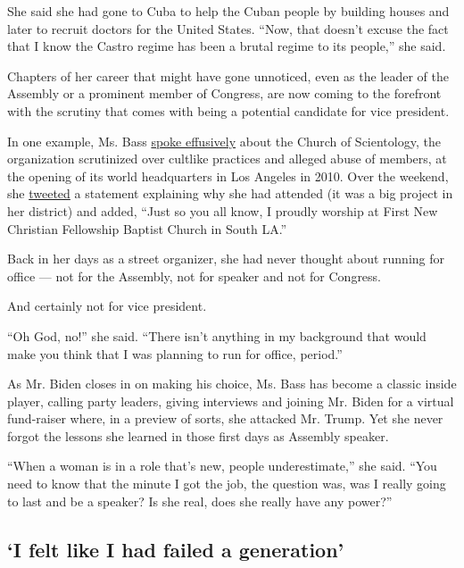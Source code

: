 She said she had gone to Cuba to help the Cuban people by building
houses and later to recruit doctors for the United States. ``Now, that
doesn't excuse the fact that I know the Castro regime has been a brutal
regime to its people,'' she said.

Chapters of her career that might have gone unnoticed, even as the
leader of the Assembly or a prominent member of Congress, are now coming
to the forefront with the scrutiny that comes with being a potential
candidate for vice president.

In one example, Ms. Bass
\href{https://www.scientology.org/scientology-today/church-openings/church-of-scientology-los-angeles.html}{spoke
effusively} about the Church of Scientology, the organization
scrutinized over cultlike practices and alleged abuse of members, at the
opening of its world headquarters in Los Angeles in 2010. Over the
weekend, she
\href{https://twitter.com/KarenBassTweets/status/1289574623424573442?s=20}{tweeted}
a statement explaining why she had attended (it was a big project in her
district) and added, ``Just so you all know, I proudly worship at First
New Christian Fellowship Baptist Church in South LA.''

Back in her days as a street organizer, she had never thought about
running for office --- not for the Assembly, not for speaker and not for
Congress.

And certainly not for vice president.

``Oh God, no!'' she said. ``There isn't anything in my background that
would make you think that I was planning to run for office, period.''

As Mr. Biden closes in on making his choice, Ms. Bass has become a
classic inside player, calling party leaders, giving interviews and
joining Mr. Biden for a virtual fund-raiser where, in a preview of
sorts, she attacked Mr. Trump. Yet she never forgot the lessons she
learned in those first days as Assembly speaker.

``When a woman is in a role that's new, people underestimate,'' she
said. ``You need to know that the minute I got the job, the question
was, was I really going to last and be a speaker? Is she real, does she
really have any power?''

\hypertarget{i-felt-like-i-had-failed-a-generation}{%
\subsection{`I felt like I had failed a
generation'}\label{i-felt-like-i-had-failed-a-generation}}

